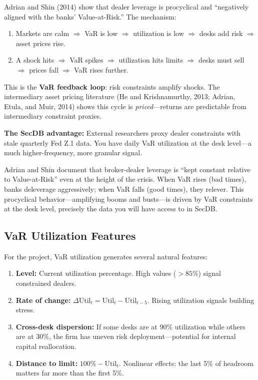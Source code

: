 \begin{keyidea}
Adrian and Shin (2014) show that dealer leverage is procyclical and
``negatively aligned with the banks' Value-at-Risk.''  The mechanism:

\begin{enumerate}[nosep]
  \item Markets are calm $\Rightarrow$ VaR is low $\Rightarrow$
        utilization is low $\Rightarrow$ desks add risk $\Rightarrow$
        asset prices rise.
  \item A shock hits $\Rightarrow$ VaR spikes $\Rightarrow$ utilization
        hits limits $\Rightarrow$ desks must sell $\Rightarrow$ prices
        fall $\Rightarrow$ VaR rises further.
\end{enumerate}

This is the \textbf{VaR feedback loop}: risk constraints amplify shocks.
The intermediary asset pricing literature (He and Krishnamurthy, 2013;
Adrian, Etula, and Muir, 2014) shows this cycle is \emph{priced}---returns
are predictable from intermediary constraint proxies.

\textbf{The SecDB advantage:} External researchers proxy dealer
constraints with stale quarterly Fed Z.1 data.  You have daily VaR
utilization at the desk level---a much higher-frequency, more granular
signal.
\end{keyidea}

\begin{keyresult}
Adrian and Shin document that broker-dealer leverage is ``kept constant
relative to Value-at-Risk'' even at the height of the crisis.  When VaR
rises (bad times), banks deleverage aggressively; when VaR falls (good
times), they relever.  This procyclical behavior---amplifying booms and
busts---is driven by VaR constraints at the desk level, precisely the
data you will have access to in SecDB.
\end{keyresult}

\subsection{VaR Utilization Features}

For the project, VaR utilization generates several natural features:

\begin{enumerate}[nosep]
  \item \textbf{Level:} Current utilization percentage.  High values
        ($>85\%$) signal constrained dealers.
  \item \textbf{Rate of change:} $\Delta\text{Util}_t =
        \text{Util}_t - \text{Util}_{t-5}$.  Rising utilization signals
        building stress.
  \item \textbf{Cross-desk dispersion:} If some desks are at 90\%
        utilization while others are at 30\%, the firm has uneven risk
        deployment---potential for internal capital reallocation.
  \item \textbf{Distance to limit:} $100\% - \text{Util}_t$.  Nonlinear
        effects: the last 5\% of headroom matters far more than the
        first 5\%.
\end{enumerate}

